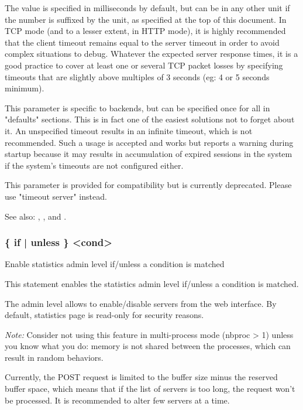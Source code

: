  The value is specified in milliseconds by default, but can be in any other
  unit if the number is suffixed by the unit, as specified at the top of this
  document. In TCP mode (and to a lesser extent, in HTTP mode), it is highly
  recommended that the client timeout remains equal to the server timeout in
  order to avoid complex situations to debug. Whatever the expected server
  response times, it is a good practice to cover at least one or several TCP
  packet losses by specifying timeouts that are slightly above multiples of 3
  seconds (eg: 4 or 5 seconds minimum).

  This parameter is specific to backends, but can be specified once for all in
  "defaults" sections. This is in fact one of the easiest solutions not to
  forget about it. An unspecified timeout results in an infinite timeout, which
  is not recommended. Such a usage is accepted and works but reports a warning
  during startup because it may results in accumulation of expired sessions in
  the system if the system's timeouts are not configured either.

  This parameter is provided for compatibility but is currently deprecated.
  Please use "timeout server" instead.


See also: , ,  and
             .

\subsubsection[stats admin]{ \{ if | unless \} <cond>}

  Enable statistics admin level if/unless a condition is matched


  This statement enables the statistics admin level if/unless a condition is
  matched.

  The admin level allows to enable/disable servers from the web interface. By
  default, statistics page is read-only for security reasons.

  \emph{Note:} Consider not using this feature in multi-process mode (nbproc > 1)
         unless you know what you do: memory is not shared between the
         processes, which can result in random behaviors.

  Currently, the POST request is limited to the buffer size minus the reserved
  buffer space, which means that if the list of servers is too long, the
  request won't be processed. It is recommended to alter few servers at a
  time.
  
